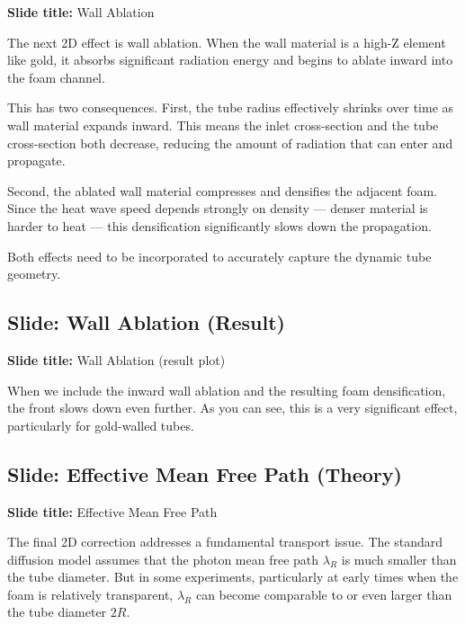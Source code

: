\documentclass[12pt, a4paper]{article}
\begin{document}
\begin{slidebox}
\textbf{Slide title:} Wall Ablation
\end{slidebox}

The next 2D effect is wall ablation. When the wall material is a high-Z element like gold, it absorbs significant radiation energy and begins to ablate inward into the foam channel.

This has two consequences. First, the tube radius effectively shrinks over time as wall material expands inward. This means the inlet cross-section and the tube cross-section both decrease, reducing the amount of radiation that can enter and propagate.

Second, the ablated wall material compresses and densifies the adjacent foam. Since the heat wave speed depends strongly on density --- denser material is harder to heat --- this densification significantly slows down the propagation.

Both effects need to be incorporated to accurately capture the dynamic tube geometry.

\subsection{Slide: Wall Ablation (Result)}

\begin{slidebox}
\textbf{Slide title:} Wall Ablation (result plot)
\end{slidebox}

When we include the inward wall ablation and the resulting foam densification, the front slows down even further. As you can see, this is a very significant effect, particularly for gold-walled tubes.

\subsection{Slide: Effective Mean Free Path (Theory)}

\begin{slidebox}
\textbf{Slide title:} Effective Mean Free Path
\end{slidebox}

The final 2D correction addresses a fundamental transport issue. The standard diffusion model assumes that the photon mean free path $\lambda_R$ is much smaller than the tube diameter. But in some experiments, particularly at early times when the foam is relatively transparent, $\lambda_R$ can become comparable to or even larger than the tube diameter $2R$.
\end{document}

